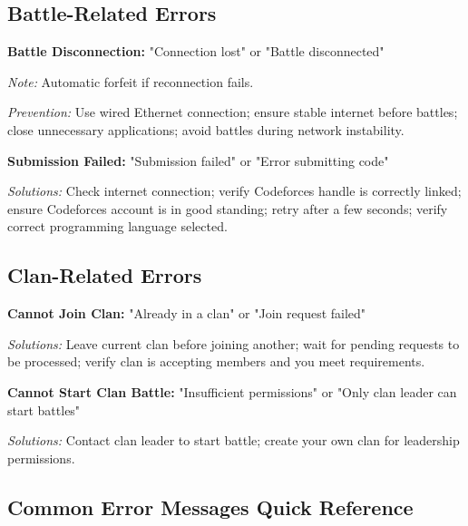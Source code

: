 \documentclass[12pt,a4paper]{article}
\begin{document}
\subsection{Battle-Related Errors}

\textbf{Battle Disconnection:} "Connection lost" or "Battle disconnected"

\textit{Note:} Automatic forfeit if reconnection fails.

\textit{Prevention:} Use wired Ethernet connection; ensure stable internet before battles; close unnecessary applications; avoid battles during network instability.

\textbf{Submission Failed:} "Submission failed" or "Error submitting code"

\textit{Solutions:} Check internet connection; verify Codeforces handle is correctly linked; ensure Codeforces account is in good standing; retry after a few seconds; verify correct programming language selected.

\subsection{Clan-Related Errors}

\textbf{Cannot Join Clan:} "Already in a clan" or "Join request failed"

\textit{Solutions:} Leave current clan before joining another; wait for pending requests to be processed; verify clan is accepting members and you meet requirements.

\textbf{Cannot Start Clan Battle:} "Insufficient permissions" or "Only clan leader can start battles"

\textit{Solutions:} Contact clan leader to start battle; create your own clan for leadership permissions.

\subsection{Common Error Messages Quick Reference}
\end{document}
